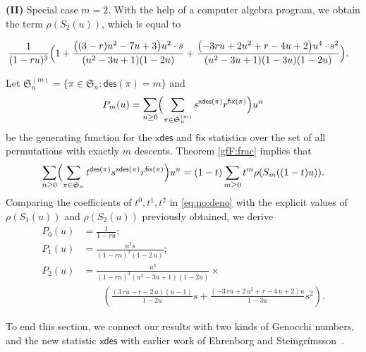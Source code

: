 \documentclass[12pt]{amsart} %
\numberwithin{equation}{section}
\theoremstyle{plain}
\theoremstyle{definition}
\def\xdes{\mathsf{xdes}}
\def\fix{\mathsf{fix}}
\def\des{\mathsf{des}}
\def\S{\mathfrak{S}}
\begin{document}
{\bf (II)} Special case $m=2$. With the help of a computer algebra program, we obtain the term $\rho(S_2(u))$, which is equal to

 \begin{align*}
 	&\frac{1}{(1-ru)^3}
 	\Bigl(	1 +
 	 \frac{{\left((3-r)  u^{2} - 7  u + 3\right)} u^{2}\cdot s}{{\left(u^{2} - 3  u + 1\right)} {\left(1- 2  u \right)}}
 	+
 	\frac{{\left(-3  r u + 2  u^{2} + r - 4  u + 2\right)}   u^{4}\cdot s^2}{{\left(u^{2} - 3  u + 1\right)} {\left(1-3  u \right)} {\left(1-2  u \right)}}
 	\Bigr).
 \end{align*}
 



Let $\S_n^{(m)} = \{ \pi \in \S_n : \des(\pi)=m\}$ and 
\begin{equation}\label{def:Pj}
	P_m(u) =  \sum_{n\geq 0}\Bigl(	\sum_{\pi \in \S_n^{(m)}} s^{\xdes(\pi)} r^{\fix(\pi)}\Bigr) u^n
\end{equation}
be the generating function for the $\xdes$ and $\fix$ statistics over the 
set of all permutations with exactly $m$ descents.
Theorem \ref{gfF:frac} implies that
\begin{equation}\label{eq:no:deno}
\sum_{n\geq 0} \Bigl( \sum_{\pi\in \S_n} 
	 t^{\des(\pi)}  s^{\xdes(\pi)}  r^{\fix(\pi)}\Bigr)  {u^n}
	 = (1-t)\sum_{m\geq 0} t^m \rho(S_m((1-t)u)).
\end{equation}
Comparing the coefficients of $t^0, t^1, t^2$ in \eqref{eq:no:deno} with
the explicit values of $\rho(S_1(u))$ and $\rho(S_2(u))$ previously obtained, we derive
\begin{align*}
	P_0(u)
		&=  \frac{1}{1- r u }; \\
		P_1(u)
		&= 
\frac{u^{2} s}{{\left(1-r u \right)}^{2} {\left(1-2 \, u \right)}};
		 \\
		P_2(u)
		&=  
		\frac{u^3}{(1-ru)^3(u^2-3u+1)(1-2u)}  \times \\
		& \qquad \left(
	\frac{ {\left(3 \, r u - r - 2 \, u\right)} {\left(u - 1\right)}  }{ {1-2 u }} s 
	+ \frac{{\left(-3 \, r u + 2 \, u^{2} + r - 4 \, u + 2\right)} u }{1-3u} s^2 \right).\nonumber
\end{align*}


To end this section, we connect our results with two kinds of Genocchi numbers, and the new statistic $\xdes$ with earlier work of Ehrenborg and Steingr\'imsson~\cite{es}.
\end{document}
